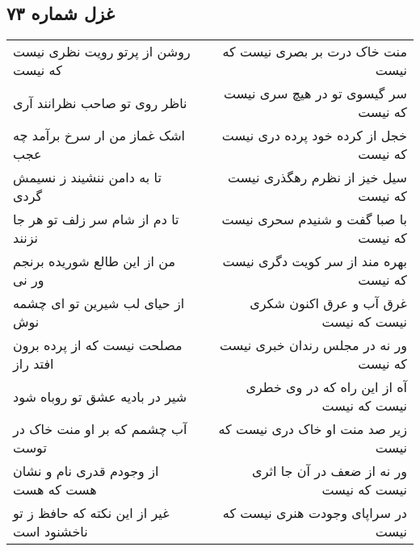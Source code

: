 \begin{center}
\section*{غزل شماره ۷۳}
\label{sec:sh073}
\begin{longtable}{l p{0.5cm} r}
روشن از پرتو رویت نظری نیست که نیست
&&
منت خاک درت بر بصری نیست که نیست
\\
ناظر روی تو صاحب نظرانند آری
&&
سر گیسوی تو در هیچ سری نیست که نیست
\\
اشک غماز من ار سرخ برآمد چه عجب
&&
خجل از کرده خود پرده دری نیست که نیست
\\
تا به دامن ننشیند ز نسیمش گردی
&&
سیل خیز از نظرم رهگذری نیست که نیست
\\
تا دم از شام سر زلف تو هر جا نزنند
&&
با صبا گفت و شنیدم سحری نیست که نیست
\\
من از این طالع شوریده برنجم ور نی
&&
بهره مند از سر کویت دگری نیست که نیست
\\
از حیای لب شیرین تو ای چشمه نوش
&&
غرق آب و عرق اکنون شکری نیست که نیست
\\
مصلحت نیست که از پرده برون افتد راز
&&
ور نه در مجلس رندان خبری نیست که نیست
\\
شیر در بادیه عشق تو روباه شود
&&
آه از این راه که در وی خطری نیست که نیست
\\
آب چشمم که بر او منت خاک در توست
&&
زیر صد منت او خاک دری نیست که نیست
\\
از وجودم قدری نام و نشان هست که هست
&&
ور نه از ضعف در آن جا اثری نیست که نیست
\\
غیر از این نکته که حافظ ز تو ناخشنود است
&&
در سراپای وجودت هنری نیست که نیست
\\
\end{longtable}
\end{center}
